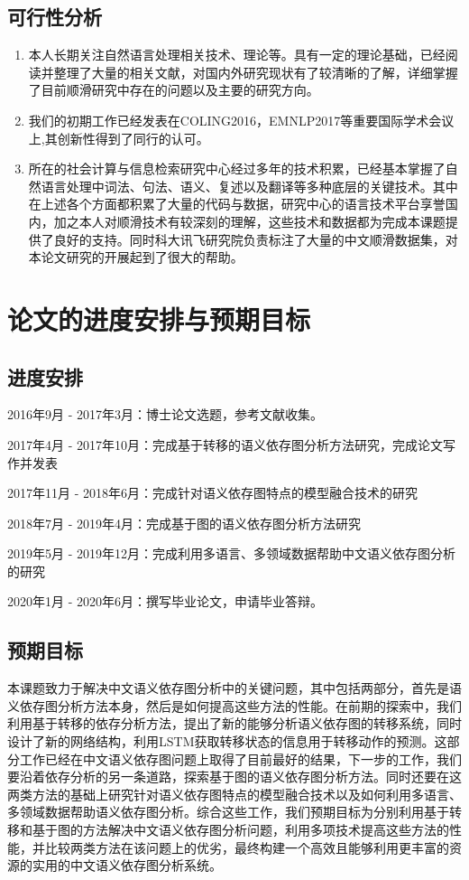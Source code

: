 \subsection{可行性分析}
\begin{enumerate}
	\item 本人长期关注自然语言处理相关技术、理论等。具有一定的理论基础，已经阅读并整理了大量的相关文献，对国内外研究现状有了较清晰的了解，详细掌握了目前顺滑研究中存在的问题以及主要的研究方向。
	
	\item 我们的初期工作已经发表在COLING2016，EMNLP2017等重要国际学术会议上,其创新性得到了同行的认可。
	
	\item 所在的社会计算与信息检索研究中心经过多年的技术积累，已经基本掌握了自然语言处理中词法、句法、语义、复述以及翻译等多种底层的关键技术。其中在上述各个方面都积累了大量的代码与数据，研究中心的语言技术平台享誉国内，加之本人对顺滑技术有较深刻的理解，这些技术和数据都为完成本课题提供了良好的支持。同时科大讯飞研究院负责标注了大量的中文顺滑数据集，对本论文研究的开展起到了很大的帮助。
	
	
\end{enumerate}
\section{论文的进度安排与预期目标}

\subsection{进度安排}

2016年9月 - 2017年3月：博士论文选题，参考文献收集。

2017年4月 - 2017年10月：完成基于转移的语义依存图分析方法研究，完成论文写作并发表

2017年11月 - 2018年6月：完成针对语义依存图特点的模型融合技术的研究

2018年7月 - 2019年4月：完成基于图的语义依存图分析方法研究

2019年5月 - 2019年12月：完成利用多语言、多领域数据帮助中文语义依存图分析的研究

2020年1月 - 2020年6月：撰写毕业论文，申请毕业答辩。


\subsection{预期目标}

本课题致力于解决中文语义依存图分析中的关键问题，其中包括两部分，首先是语义依存图分析方法本身，然后是如何提高这些方法的性能。在前期的探索中，我们利用基于转移的依存分析方法，提出了新的能够分析语义依存图的转移系统，同时设计了新的网络结构，利用LSTM获取转移状态的信息用于转移动作的预测。这部分工作已经在中文语义依存图问题上取得了目前最好的结果，下一步的工作，我们要沿着依存分析的另一条道路，探索基于图的语义依存图分析方法。同时还要在这两类方法的基础上研究针对语义依存图特点的模型融合技术以及如何利用多语言、多领域数据帮助语义依存图分析。综合这些工作，我们预期目标为分别利用基于转移和基于图的方法解决中文语义依存图分析问题，利用多项技术提高这些方法的性能，并比较两类方法在该问题上的优劣，最终构建一个高效且能够利用更丰富的资源的实用的中文语义依存图分析系统。

